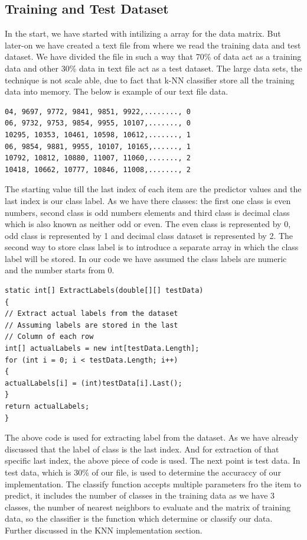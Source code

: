 \documentclass[conference]{IEEEtran}
\begin{document}
\subsection{Training and Test Dataset}
In the start, we have started with intilizing a array for the data matrix. But later-on we have created a text file from where we read the training data and test dataset. We have divided the file in such a way that 70\% of data act as a training data and other 30\% data in text file act as a test dataset. The large data sets, the technique is not scale able, due to fact that k-NN classifier store all the training data into memory. The below is example of our text file data. 
\begin{lstlisting}
04, 9697, 9772, 9841, 9851, 9922,........, 0
06, 9732, 9753, 9854, 9955, 10107,......., 0
10295, 10353, 10461, 10598, 10612,......., 1
06, 9854, 9881, 9955, 10107, 10165,......, 1
10792, 10812, 10880, 11007, 11060,......., 2
10418, 10662, 10777, 10846, 11008,......., 2
\end{lstlisting}
The starting value till the last index of each item are the predictor values and the last index is our class label. As we have there classes: the first one class is even numbers, second class is odd numbers elements and third class is decimal class which is also known as neither odd or even. The even class is represented by 0, odd class is represented by 1 and decimal class dataset is represented by 2. The second way to store class label is to introduce a separate array in which the class label will be stored. In our code we have assumed the class labels are numeric and the number starts from 0. 
\begin{lstlisting}
static int[] ExtractLabels(double[][] testData)
{
// Extract actual labels from the dataset
// Assuming labels are stored in the last 
// Column of each row
int[] actualLabels = new int[testData.Length];
for (int i = 0; i < testData.Length; i++)
{
actualLabels[i] = (int)testData[i].Last();
}
return actualLabels;
}
\end{lstlisting}

The above code is used for extracting label from the dataset. As we have already discussed that the label of class is the last index. And for extraction of that specific last index, the above piece of code is used. The next point is test data. In test data, which is 30\% of our file, is used to determine the accuraccy of our implementation. The classify function accepts multiple parameters fro the item to predict, it includes the number of classes in the training data as we have 3 classes, the number of nearest neighbors to evaluate and the matrix of training data, so the classifier is the function which determine or classify our data. Further discussed in the KNN implementation section. 
\end{document}
